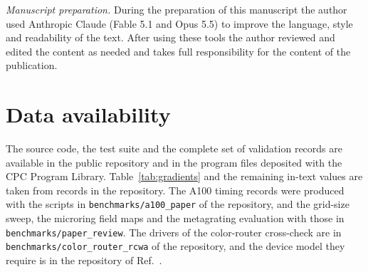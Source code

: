 \documentclass[preprint,11pt]{elsarticle}
\newcommand{\code}[1]{{\small\nolinkurl{#1}}}
\begin{document}
\textit{Manuscript preparation.} During the preparation of this manuscript the author used Anthropic Claude (Fable 5.1 and Opus 5.5) to improve the language, style and readability of the text. After using these tools the author reviewed and edited the content as needed and takes full responsibility for the content of the publication.

\section*{Data availability}

The source code, the test suite and the complete set of validation records are available in the public repository \citep{torchfdtd} and in the program files deposited with the CPC Program Library. Table~\ref{tab:gradients} and the remaining in-text values are taken from records in the repository. The A100 timing records were produced with the scripts in \code{benchmarks/a100_paper} of the repository, and the grid-size sweep, the microring field maps and the metagrating evaluation with those in \code{benchmarks/paper_review}. The drivers of the color-router cross-check are in \code{benchmarks/color_router_rcwa} of the repository, and the device model they require is in the repository of Ref.~\citep{park2026colorrouter}.



\end{document}
